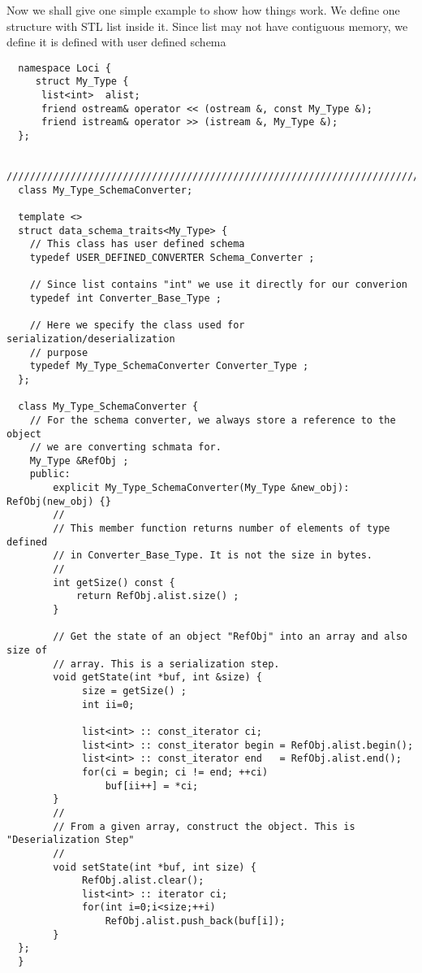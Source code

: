 %
Now we shall give one simple example to show how things work. We define
one structure with STL list inside it. Since list may not have contiguous
memory, we define it is defined with user defined schema
\begin{verbatim}
  namespace Loci {
     struct My_Type {
      list<int>  alist;
      friend ostream& operator << (ostream &, const My_Type &);
      friend istream& operator >> (istream &, My_Type &);
  };

  //////////////////////////////////////////////////////////////////////////////////////
  class My_Type_SchemaConverter;

  template <>
  struct data_schema_traits<My_Type> {
    // This class has user defined schema
    typedef USER_DEFINED_CONVERTER Schema_Converter ;

    // Since list contains "int" we use it directly for our converion
    typedef int Converter_Base_Type ;
   
    // Here we specify the class used for serialization/deserialization 
    // purpose
    typedef My_Type_SchemaConverter Converter_Type ;
  };

  class My_Type_SchemaConverter {
    // For the schema converter, we always store a reference to the object
    // we are converting schmata for.
    My_Type &RefObj ;
    public:
        explicit My_Type_SchemaConverter(My_Type &new_obj): RefObj(new_obj) {}
        //
        // This member function returns number of elements of type defined
        // in Converter_Base_Type. It is not the size in bytes.
        //
        int getSize() const {
            return RefObj.alist.size() ;
        }
      
        // Get the state of an object "RefObj" into an array and also size of
        // array. This is a serialization step. 
        void getState(int *buf, int &size) {
             size = getSize() ;
             int ii=0;

             list<int> :: const_iterator ci;
             list<int> :: const_iterator begin = RefObj.alist.begin();
             list<int> :: const_iterator end   = RefObj.alist.end();
             for(ci = begin; ci != end; ++ci) 
                 buf[ii++] = *ci;
        }
        //
        // From a given array, construct the object. This is "Deserialization Step"
        //
        void setState(int *buf, int size) {
             RefObj.alist.clear();
             list<int> :: iterator ci;
             for(int i=0;i<size;++i)
                 RefObj.alist.push_back(buf[i]);
        }
  };
  }
\end{verbatim}
%
%
